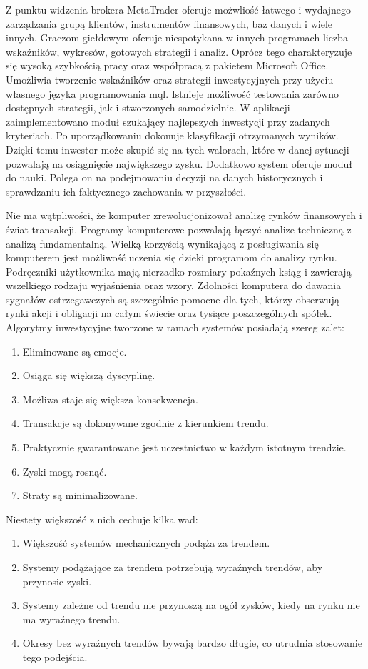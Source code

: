 \documentclass[pdflatex,11pt]{aghdpl}
\begin{document}
Z punktu widzenia brokera MetaTrader oferuje możwliość łatwego i wydajnego zarządzania grupą klientów, instrumentów finansowych, baz danych i wiele innych. Graczom giełdowym oferuje niespotykana w innych programach liczba wskaźników, wykresów, gotowych strategii i analiz. Oprócz tego charakteryzuje się wysoką szybkością pracy oraz współpracą z pakietem Microsoft Office. Umożliwia tworzenie wskaźników oraz strategii inwestycyjnych przy użyciu własnego języka programowania mql. Istnieje możliwość testowania zarówno dostępnych strategii, jak i stworzonych samodzielnie. W aplikacji zaimplementowano moduł szukający najlepszych inwestycji przy zadanych kryteriach. Po uporządkowaniu dokonuje klasyfikacji otrzymanych wyników. Dzięki temu inwestor może skupić się na tych walorach, które w danej sytuacji pozwalają na osiągnięcie największego zysku. Dodatkowo system oferuje moduł do nauki. Polega on na podejmowaniu decyzji na danych historycznych i sprawdzaniu ich faktycznego zachowania w przyszłości.

Nie ma wątpliwości, że komputer zrewolucjonizował analizę rynków finansowych i świat transakcji. Programy komputerowe pozwalają łączyć analize techniczną z analizą fundamentalną. Wielką korzyścią wynikającą z posługiwania się komputerem jest możliwość uczenia się dzieki programom do analizy rynku. Podręczniki użytkownika mają nierzadko rozmiary pokaźnych ksiąg i zawierają wszelkiego rodzaju wyjaśnienia oraz wzory. Zdolności komputera do dawania sygnałów ostrzegawczych są szczególnie pomocne dla tych, którzy obserwują rynki akcji i obligacji na całym świecie oraz tysiące poszczególnych spółek. Algorytmy inwestycyjne tworzone w ramach systemów posiadają szereg zalet:
\begin{enumerate}
\item Eliminowane są emocje.
\item Osiąga się większą dyscyplinę.
\item Możliwa staje się większa konsekwencja.
\item Transakcje są dokonywane zgodnie z kierunkiem trendu.
\item Praktycznie gwarantowane jest uczestnictwo w każdym istotnym trendzie.
\item Zyski mogą rosnąć.
\item Straty są minimalizowane.
\end{enumerate}

Niestety większość z nich cechuje kilka wad:
\begin{enumerate}
\item Większość systemów mechanicznych podąża za trendem.
\item Systemy podążające za trendem potrzebują wyraźnych trendów, aby przynosic zyski.
\item Systemy zależne od trendu nie przynoszą na ogół zysków, kiedy na rynku nie ma wyraźnego trendu.
\item Okresy bez wyraźnych trendów bywają bardzo długie, co utrudnia stosowanie tego podejścia.
\end{enumerate}
\end{document}
